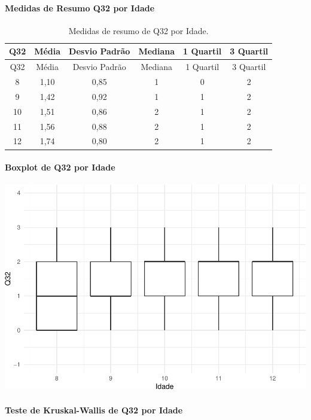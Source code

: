 \documentclass[]{article}
\let\oldparagraph\paragraph
\renewcommand{\paragraph}[1]{\oldparagraph{#1}\mbox{}}
\begin{document}
\cleardoublepage

\hypertarget{medidas-de-resumo-q32-por-idade}{%
\paragraph{Medidas de Resumo Q32 por Idade}\label{medidas-de-resumo-q32-por-idade}}

\begin{longtable}[]{@{}cccccc@{}}
\caption{\label{tab:unnamed-chunk-1099}Medidas de resumo de Q32 por Idade.}\tabularnewline
\toprule
Q32 & Média & Desvio Padrão & Mediana & 1 Quartil & 3 Quartil\tabularnewline
\midrule
\endfirsthead
\toprule
Q32 & Média & Desvio Padrão & Mediana & 1 Quartil & 3 Quartil\tabularnewline
\midrule
\endhead
8 & 1,10 & 0,85 & 1 & 0 & 2\tabularnewline
9 & 1,42 & 0,92 & 1 & 1 & 2\tabularnewline
10 & 1,51 & 0,86 & 2 & 1 & 2\tabularnewline
11 & 1,56 & 0,88 & 2 & 1 & 2\tabularnewline
12 & 1,74 & 0,80 & 2 & 1 & 2\tabularnewline
\bottomrule
\end{longtable}

\hypertarget{boxplot-de-q32-por-idade}{%
\paragraph{Boxplot de Q32 por Idade}\label{boxplot-de-q32-por-idade}}

\begin{center}\includegraphics[width=0.75\linewidth]{relatorio_covid19_files/figure-latex/unnamed-chunk-1100-1} \end{center}

\hypertarget{teste-de-kruskal-wallis-de-q32-por-idade}{%
\paragraph{Teste de Kruskal-Wallis de Q32 por Idade}\label{teste-de-kruskal-wallis-de-q32-por-idade}}
\end{document}
